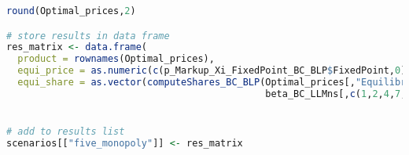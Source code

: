 \begin{lstlisting}[language=R,caption={Computing dynamic Nash equilibria in different competitive scenarios via the fixed point algorithm}, label=lst_nash_esti]
round(Optimal_prices,2)

# store results in data frame
res_matrix <- data.frame(
  product = rownames(Optimal_prices),
  equi_price = as.numeric(c(p_Markup_Xi_FixedPoint_BC_BLP$FixedPoint,0)),
  equi_share = as.vector(computeShares_BC_BLP(Optimal_prices[,"Equilibrium Price"],
                                              beta_BC_LLMns[,c(1,2,4,7,9,10,11)],designBase,pr=1)))


# add to results list
scenarios[["five_monopoly"]] <- res_matrix
\end{lstlisting}